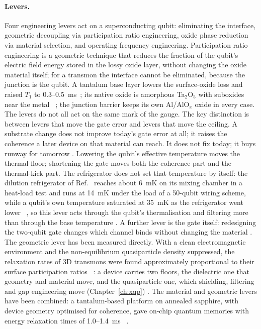 \paragraph{Levers.} Four engineering levers act on a superconducting qubit: eliminating the interface, geometric decoupling via
participation ratio engineering, oxide phase reduction via material selection, and operating frequency engineering. Participation ratio
engineering is a geometric technique that reduces the fraction of the qubit's electric field energy stored in the lossy oxide layer,
without changing the oxide material itself; for a transmon the interface cannot be eliminated, because the junction is the qubit. A tantalum base layer lowers the surface-oxide
loss and raised $T_1$ to 0.3--0.5~ms~\cite{Place2021,Wang2022Ta}; its native oxide is amorphous Ta$_2$O$_5$ with suboxides near the
metal~\cite{Crowley2023} \observed; the junction barrier keeps its own Al/AlO$_x$ oxide in every case. The levers do not all act on the
same mark of the gauge. The key distinction is between levers that move the gate error and levers that move the ceiling. A substrate
change does not improve today's gate error at all; it raises the coherence a later device on that material can reach. It does not fix
today; it buys runway for tomorrow \interp.
Lowering the qubit's effective temperature moves the thermal floor; shortening the gate moves both the coherence part and the
thermal-kick part.
The refrigerator does not set that temperature by itself: the dilution refrigerator of Ref.~\cite{Krinner2019} reaches about 6~mK on its mixing chamber
in a heat-load test and runs at 14~mK under the load of a 50-qubit wiring scheme, while a qubit's own temperature saturated at 35~mK as the refrigerator went lower~\cite{Jin2015} \observed, so this lever acts
through the qubit's thermalisation and filtering more than through the base temperature \interp. A further lever is the gate itself:
redesigning the two-qubit gate changes which channel binds without changing the material \interp. The geometric lever has been measured
directly. With a clean electromagnetic environment and the non-equilibrium quasiparticle density suppressed, the relaxation rates of 3D
transmons were found approximately proportional to their surface participation ratios~\cite{Wang2015TLS} \observed: a device carries two
floors, the dielectric one that geometry and material move, and the quasiparticle one, which shielding, filtering and gap engineering
move (Chapter~\ref{ch:xqp}) \interp. The material and geometric levers have been combined: a tantalum-based platform on annealed
sapphire, with device geometry optimised for coherence, gave on-chip quantum memories with energy relaxation times of
1.0--1.4~ms~\cite{Ganjam2024} \observed.

